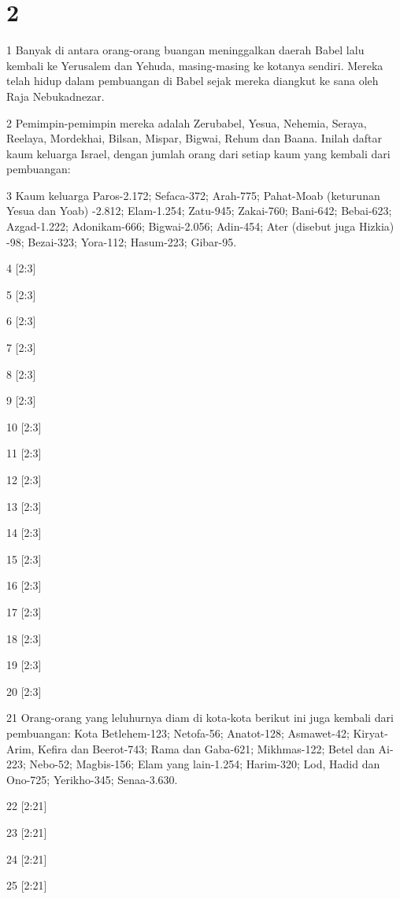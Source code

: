 \chapter{2}

\par 1 Banyak di antara orang-orang buangan meninggalkan daerah Babel lalu kembali ke Yerusalem dan Yehuda, masing-masing ke kotanya sendiri. Mereka telah hidup dalam pembuangan di Babel sejak mereka diangkut ke sana oleh Raja Nebukadnezar.
\par 2 Pemimpin-pemimpin mereka adalah Zerubabel, Yesua, Nehemia, Seraya, Reelaya, Mordekhai, Bilsan, Mispar, Bigwai, Rehum dan Baana. Inilah daftar kaum keluarga Israel, dengan jumlah orang dari setiap kaum yang kembali dari pembuangan:
\par 3 Kaum keluarga Paros-2.172; Sefaca-372; Arah-775; Pahat-Moab (keturunan Yesua dan Yoab) -2.812; Elam-1.254; Zatu-945; Zakai-760; Bani-642; Bebai-623; Azgad-1.222; Adonikam-666; Bigwai-2.056; Adin-454; Ater (disebut juga Hizkia) -98; Bezai-323; Yora-112; Hasum-223; Gibar-95.
\par 4 [2:3]
\par 5 [2:3]
\par 6 [2:3]
\par 7 [2:3]
\par 8 [2:3]
\par 9 [2:3]
\par 10 [2:3]
\par 11 [2:3]
\par 12 [2:3]
\par 13 [2:3]
\par 14 [2:3]
\par 15 [2:3]
\par 16 [2:3]
\par 17 [2:3]
\par 18 [2:3]
\par 19 [2:3]
\par 20 [2:3]
\par 21 Orang-orang yang leluhurnya diam di kota-kota berikut ini juga kembali dari pembuangan: Kota Betlehem-123; Netofa-56; Anatot-128; Asmawet-42; Kiryat-Arim, Kefira dan Beerot-743; Rama dan Gaba-621; Mikhmas-122; Betel dan Ai-223; Nebo-52; Magbis-156; Elam yang lain-1.254; Harim-320; Lod, Hadid dan Ono-725; Yerikho-345; Senaa-3.630.
\par 22 [2:21]
\par 23 [2:21]
\par 24 [2:21]
\par 25 [2:21]
